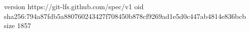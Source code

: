version https://git-lfs.github.com/spec/v1
oid sha256:794a87fdb5a880760243427f708450b878cf9269ad1e5d0c447ab4814e836bcb
size 1857
